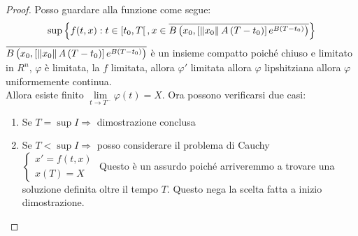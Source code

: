 \begin{proof}
	Posso guardare alla funzione come segue:\\
	$$
	\sup
	\left\{f(t,x): t\in\left[t_0,T\right[, x\in \overline{B\left(x_0,
		\left[ 
			\left\|x_0\right\| A \left(T-t_0\right)
		\right]e^{B\left(T-t_0\right)}\right)}
	\right\}
	$$
	$\overline{B\left(x_0,
		\left[ 
		\left\|x_0\right\| A \left(T-t_0\right)
		\right]e^{B\left(T-t_0\right)}\right)}
	$ è un insieme compatto poiché chiuso e limitato in $R^n$, $\varphi$ è limitata, la $f$ limitata, allora $ \varphi'$ limitata allora $\varphi$ lipshitziana allora $\varphi$ uniformemente continua.\\
		Allora esiste finito $\lim\limits_{t\to T^{-}}\varphi(t)=X$. Ora possono verificarsi due casi:\\
	\begin{enumerate}
		\item Se $T=\sup I \Rightarrow$ dimostrazione conclusa
		\item Se $T<\sup I \Rightarrow$ posso considerare il problema di Cauchy \\
		$\left\{ \begin{matrix}  x'=f(t,x)\\x(T)=X \end{matrix} \right.$ Questo è un assurdo poiché arriveremmo a trovare una soluzione definita oltre il tempo $T$. Questo nega la scelta fatta a inizio dimostrazione.
		\end{enumerate}
\end{proof}
